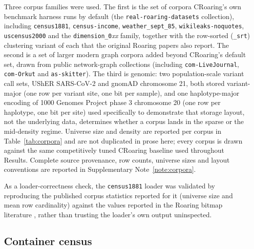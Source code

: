 \begin{sloppypar}
Three corpus families were used. The first is the set of corpora CRoaring's own benchmark harness runs
by default (the \texttt{real-roaring-datasets} collection), including \texttt{census1881},
\texttt{census-income}, \texttt{weather\_sept\_85}, \texttt{wikileaks-noquotes}, \texttt{uscensus2000}
and the \texttt{dimension\_0}\emph{xx} family, together with the row-sorted (\texttt{\_srt}) clustering
variant of each that the original Roaring papers also report. The second is a set of larger modern
graph corpora added beyond CRoaring's default set, drawn from public network-graph collections
(including \texttt{com-LiveJournal}, \texttt{com-Orkut} and \texttt{as-skitter}). The third is genomic:
two population-scale variant call sets, UShER SARS-CoV-2 and gnomAD chromosome 21, both stored
variant-major (one row per variant site, one bit per sample), and one haplotype-major encoding of 1000
Genomes Project phase 3 chromosome 20 (one row per haplotype, one bit per site) used specifically to
demonstrate that storage layout, not the underlying data, determines whether a corpus lands in the
sparse or the mid-density regime. Universe size and density are reported per corpus in
Table~\ref{tab:corpora} and are not duplicated in prose here; every corpus is drawn against the same competitively tuned
CRoaring baseline used throughout Results. Complete source provenance, row counts, universe sizes and
layout conventions are reported in Supplementary Note~\ref{note:corpora}.

As a loader-correctness check, the \texttt{census1881} loader was validated by reproducing the
published corpus statistics reported for it (universe size and mean row cardinality) against the
values reported in the Roaring bitmap literature \cite{lemire2016roaring}, rather than trusting the
loader's own output uninspected.
\end{sloppypar}

\subsection*{Container census}

